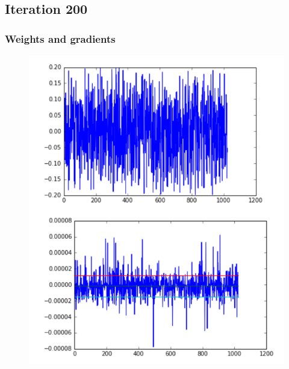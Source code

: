 \subsection{Iteration 200}
\begin{frame}
    \frametitle{Weights and gradients}
    \begin{figure}
		\includegraphics[scale=0.3]{figure/200-1.PNG}
    \end{figure}
\end{frame}
